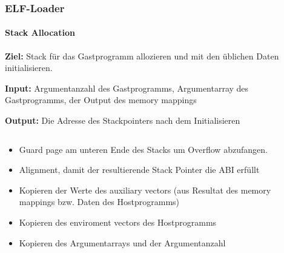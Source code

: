\documentclass[german]{tum-presentation}
\begin{document}
\begin{frame}[fragile]
    \frametitle{ELF-Loader}
    \framesubtitle{Stack Allocation}
    \textbf{Ziel:} Stack für das Gastprogramm allozieren und mit den üblichen Daten initialisieren.

    \vspace{0.25cm}
    \textbf{Input:} Argumentanzahl des Gastprogramms, Argumentarray des Gastprogramms, der Output des memory mappings

    \textbf{Output:} Die Adresse des Stackpointers nach dem Initialisieren

    \pause
    \begin{columns}[c, onlytextwidth]
		\begin{column}{0.49\textwidth}
			\begin{itemize}
				\item<3-> Guard page am unteren Ende des Stacks um Overflow abzufangen.
				\item<3-> Alignment, damit der resultierende Stack Pointer die ABI erfüllt
				\item<3-> Kopieren der Werte des auxiliary vectors (aus Resultat des memory mappings bzw. Daten des Hostprogramms)
				\item<3-> Kopieren des enviroment vectors des Hostprogramms
				\item<3-> Kopieren des Argumentarrays und der Argumentanzahl
			\end{itemize}
		\end{column}

		\begin{column}{0.49\textwidth}


\end{column}
\end{columns}
\end{frame}
\end{document}
